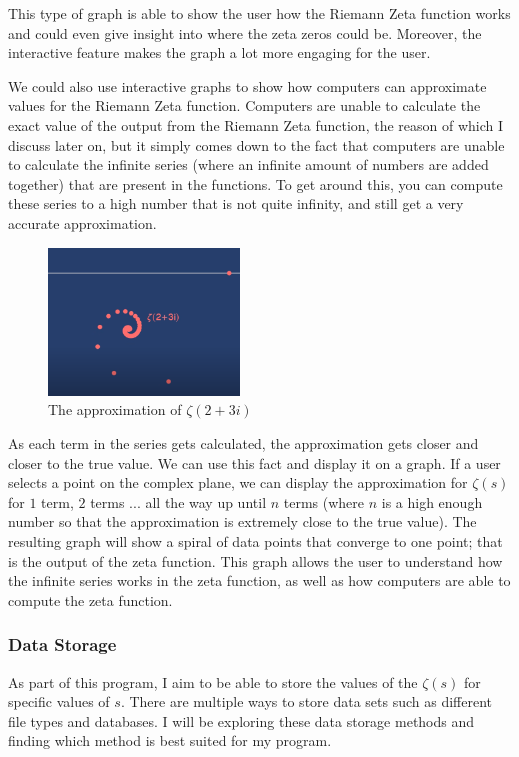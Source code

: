 \documentclass{article}
\begin{document}
This type of graph is able to show the user how the Riemann Zeta function works and could even give insight into where the zeta zeros could be. Moreover, the interactive feature makes the graph a lot more engaging for the user.


We could also use interactive graphs to show how computers can approximate values for the Riemann Zeta function. Computers are unable to calculate the exact value of the output from the Riemann Zeta function, the reason of which I discuss later on, but it simply comes down to the fact that computers are unable to calculate the infinite series (where an infinite amount of numbers are added together) that are present in the functions. To get around this, you can compute these series to a high number that is not quite infinity, and still get a very accurate approximation.


\begin{figure}
    \centering
    \captionsetup{justification=centering}
    \includegraphics[width=2.0in]{zeta-approximation}
    \caption{The approximation of $\zeta(2+3i)$}
\end{figure}

As each term in the series gets calculated, the approximation gets closer and closer to the true value. We can use this fact and display it on a graph. If a user selects a point on the complex plane, we can display the approximation for $\zeta(s)$ for $1$ term, $2$ terms ... all the way up until $n$ terms (where $n$ is a high enough number so that the approximation is extremely close to the true value). The resulting graph will show a spiral of data points that converge to one point; that is the output of the zeta function. This graph allows the user to understand how the infinite series works in the zeta function, as well as how computers are able to compute the zeta function.

\subsubsection{Data Storage}

As part of this program, I aim to be able to store the values of the $\zeta(s)$ for specific values of $s$. There are multiple ways to store data sets such as different file types and databases. I will be exploring these data storage methods and finding which method is best suited for my program.
\end{document}
